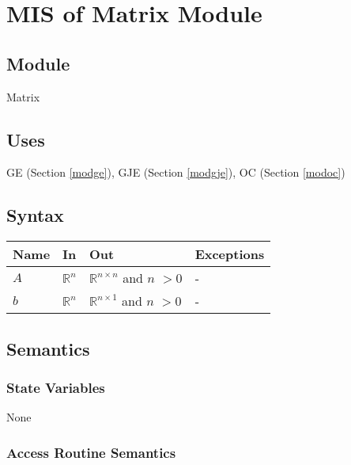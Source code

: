 \documentclass[12pt, titlepage]{article}
\begin{document}
\newpage


\section{MIS of {Matrix Module}} \label{modmatrix} %

\subsection{Module}

Matrix


\subsection{Uses}
GE (Section \ref{modge}), GJE (Section \ref{modgje}), OC (Section \ref{modoc})


\subsection{Syntax}

\begin{center}
\begin{tabular}{p{2cm} p{4cm} p{4cm} p{2cm}}
\hline
\textbf{Name} & \textbf{In} & \textbf{Out} & \textbf{Exceptions} \\
\hline
$A$ & $\mathbb{R}^n$ & $\mathbb{R}^{n \times n}$ and $n$ $> 0$ & - \\
$b$ & $\mathbb{R}^n$ & $\mathbb{R}^{n \times 1}$ and $n$ $> 0$ & - \\
\hline
\end{tabular}
\end{center}

\subsection{Semantics}

\subsubsection{State Variables}

None

\subsubsection{Access Routine Semantics}
\end{document}
